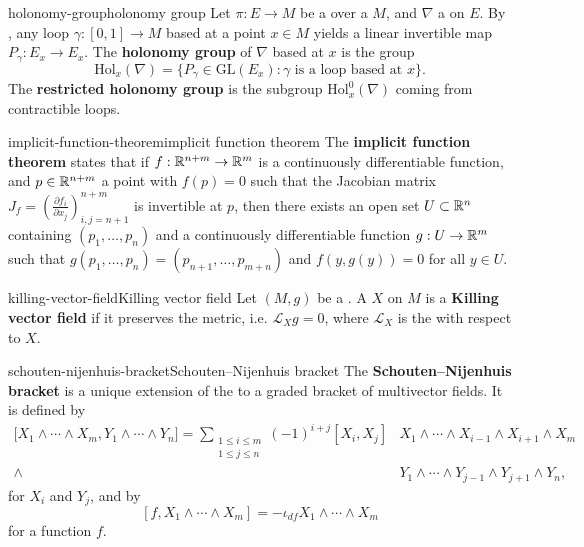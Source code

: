 \begin{topic}{holonomy-group}{holonomy group}
    Let $\pi : E \to M$ be a  over a  $M$, and $\nabla$ a  on $E$. By , any loop $\gamma : [0, 1] \to M$ based at a point $x \in M$ yields a linear invertible map $P_\gamma : E_x \to E_x$. The \textbf{holonomy group} of $\nabla$ based at $x$ is the group
    \[ \text{Hol}_x(\nabla) = \{ P_\gamma \in \text{GL}(E_x) : \gamma \text{ is a loop based at } x \} . \]
    The \textbf{restricted holonomy group} is the subgroup $\text{Hol}_x^0(\nabla)$ coming from contractible loops.
\end{topic}

\begin{topic}{implicit-function-theorem}{implicit function theorem}
    The \textbf{implicit function theorem} states that if $f : \mathbb{R}^{n + m} \to \mathbb{R}^m$ is a continuously differentiable function, and $p \in \mathbb{R}^{n + m}$ a point with $f(p) = 0$ such that the Jacobian matrix $J_f = \left(\frac{\partial f_i}{\partial x_j}\right)_{i,j = n + 1}^{n + m}$ is invertible at $p$, then there exists an open set $U \subset \mathbb{R}^n$ containing $(p_1, \ldots, p_n)$ and a continuously differentiable function $g : U \to \mathbb{R}^m$ such that $g(p_1, \ldots, p_n) = (p_{n + 1}, \ldots, p_{m + n})$ and $f(y, g(y)) = 0$ for all $y \in U$.
\end{topic}

\begin{topic}{killing-vector-field}{Killing vector field}
    Let $(M, g)$ be a . A  $X$ on $M$ is a \textbf{Killing vector field} if it preserves the metric, i.e. $\mathcal{L}_X g = 0$, where $\mathcal{L}_X$ is the  with respect to $X$.
\end{topic}

\begin{topic}{schouten-nijenhuis-bracket}{Schouten--Nijenhuis bracket}
    The \textbf{Schouten--Nijenhuis bracket} is a unique extension of the  to a graded bracket of multivector fields. It is defined by
    \[ \begin{aligned} {[}X_1 \wedge \cdots \wedge X_m, Y_1 \wedge \cdots \wedge Y_n{]} = \sum_{\substack{1 \le i \le m \\ 1 \le j \le n}} (-1)^{i + j} [X_i, X_j] &X_1 \wedge \cdots \wedge X_{i - 1} \wedge X_{i + 1} \wedge X_m \\ \wedge &Y_1 \wedge \cdots \wedge Y_{j - 1} \wedge Y_{j + 1} \wedge Y_n , \end{aligned} \]
    for  $X_i$ and $Y_j$, and by
    \[ [f, X_1 \wedge \cdots \wedge X_m] = -\iota_{df} X_1 \wedge \cdots \wedge X_m \]
    for a function $f$.
\end{topic}

